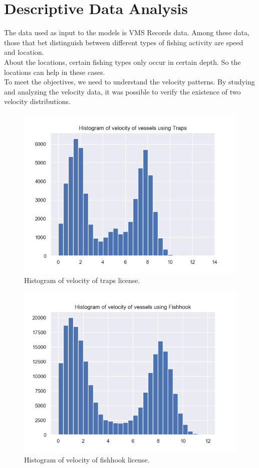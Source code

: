 

\section{Descriptive Data Analysis} %
\label{sub:data_analysis}



The data used as input to the models is VMS Records data. Among these data, those that bet distinguish between different types of fishing activity are speed and location.\\
About the locations, certain fishing types only occur in certain depth. So the locations can help in these cases. \\
To meet the objectives, we need to understand the velocity patterns.
By studying and analyzing the velocity data, it was possible to verify the existence of two velocity distributions.

\begin{figure}[h]
\centering
\includegraphics[width=0.8\linewidth]{Chapters/img/h_armadilhas.png}
\caption{Histogram of velocity of traps license.}
\label{fig:h_armadilhas}
\end{figure}


\begin{figure}[h]
\centering
\includegraphics[width=0.8\linewidth]{Chapters/img/h_linha.png}
\caption{Histogram of velocity of fishhook license.}
\label{fig:h_linha}
\end{figure}

